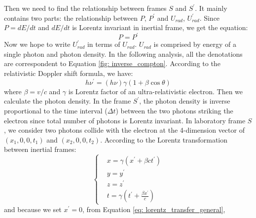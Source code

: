 \documentclass[12pt]{report}
\begin{document}
            Then we need to find the relationship between frames $S$ and $S^{\prime}$. 
            It mainly contains two parts: the relationship between $P$, $P^{\prime}$ and 
            $U_{rad}$, $U_{rad}^{\prime}$. Since $P = dE/dt$ and $dE/dt$ is Lorentz invariant 
            in inertial frame, we get the equation: 
            \begin{equation}
              \label{eq: power_is_equal}
              P = P^{\prime}
            \end{equation}
            Now we hope to write $U_{rad}^{\prime}$ in terms of $U_{rad}$. $U_{rad}$ is 
            comprised by energy of a single photon and photon density. In the following
            analysis, all the denotations are correspondent to Equation \ref{fig: inverse_compton}. 
            According to the relativistic Doppler shift formula, we have: 
            \begin{equation}
              \label{eq: doppler_shift}
              h \nu^{\prime} = \left(h \nu\right) \gamma \left(1 + \beta \cos{\theta} \right)
            \end{equation}
            where $\beta = v / c$ and $\gamma$ is Lorentz factor of an ultra-relativistic 
            electron. Then we calculate the photon density. In the frame $S^{\prime}$, the 
            photon density is inverse proportional to the time interval ($\Delta t$) between 
            the two photons striking the electron since total number of photons is Lorentz 
            invariant. In laboratory frame $S$, we consider two photons collide with the 
            electron at the 4-dimension vector of 
            $\left(x_{1}, 0, 0, t_{1}\right)$ and $\left(x_{2}, 0, 0, t_{2}\right)$. 
            According to the Lorentz transformation between inertial frames: 
            \begin{equation}
              \label{eq: lorentz_transfer_general}
                \begin{cases}
                  & x = \gamma \left( x^{\prime} + \beta c t^{\prime} \right)\\
                  & y = y^{\prime} \\
                  & z = z^{\prime} \\ 
                  & t = \gamma \left(t^{\prime} + \frac{\beta x^{\prime}}{c}\right)
                \end{cases}       
            \end{equation}
            and because we set $x^{\prime} = 0$, from Equation \ref{eq: lorentz_transfer_general}, 
\end{document}

